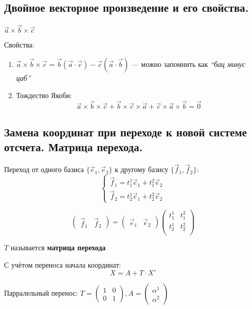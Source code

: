 \subsection{Двойное векторное произведение и его свойства.}
$\vec a\times\vec b\times\vec c$

Свойства:
\begin{enumerate}
    \item $\vec a\times\vec b\times\vec c=\vec b(\vec a\cdot\vec c) - \vec c(\vec a\cdot \vec b)$ --- можно запомнить как \textit{``бац минус цаб''}
    \item Тождество Якоби:
          $$\vec a\times\vec b\times\vec c+\vec b\times\vec c\times\vec a + \vec c\times\vec a\times\vec b=\vec 0$$
\end{enumerate}

\subsection{Замена координат при переходе к новой системе отсчета. Матрица перехода.}
Переход от одного базиса $\{\vec e_1, \vec e_2\}$ к другому базису $\{\vec f_1, \vec f_2\}$: $$\begin{cases}
        \vec f_1=t_1^1\vec e_1+t_1^2\vec e_2 \\
        \vec f_2=t_2^1\vec e_1+t_2^2\vec e_2
    \end{cases}$$

$$\begin{pmatrix}
        \vec f_1 & \vec f_2
    \end{pmatrix} = \begin{pmatrix}
        \vec e_1 & \vec e_2
    \end{pmatrix} \begin{pmatrix}
        t_1^1 & t_1^2 \\
        t_2^1 & t_2^2 \\
    \end{pmatrix}$$

\begin{definition}
    $T$ называется \textbf{матрица перехода}
\end{definition}

С учётом переноса начала координат: $$X=A+T\cdot X'$$

Парралельный перенос: $T=\begin{pmatrix}
        1 & 0 \\
        0 & 1
    \end{pmatrix}, A=\begin{pmatrix}
        \alpha^1 \\
        \alpha^2
    \end{pmatrix}$

